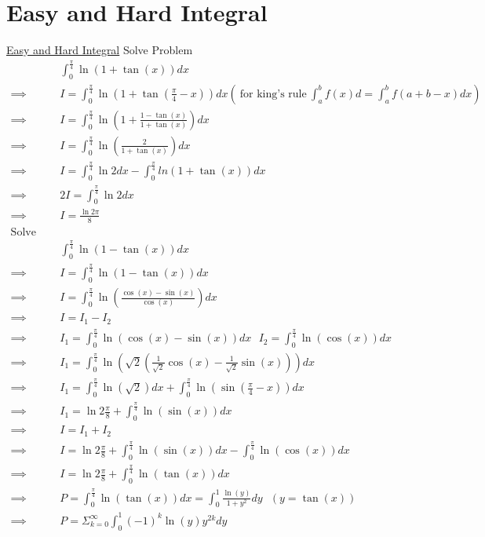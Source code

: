 \documentclass {article}
\begin{document}
\section{Easy and Hard Integral}
\href{https://www.youtube.com/watch?v=o4TR62QvQJU}{Easy and Hard Integral}
Solve Problem \\
\[
\begin{matrix}
     & \int_0^{\frac{\pi}{4}} \ln\left(1 + \tan\left(x\right)\right){d}x  \\
\implies &  I = \int_0^{\frac{\pi}{4}} \ln\left(1 + \tan\left(\frac{\pi}{4} - x\right)\right){d}x
  \left( \ \text{for king's rule}\ \int_a^b f(x){d} = \int_a^b f(a+b-x) {d}x \right) \\
\implies & I = \int_0^{\frac{\pi}{4}} \ln\left( 1 + \frac{1 - \tan(x)}{1+ \tan(x)} \right) {d}x \\
\implies & I = \int_0^{\frac{\pi}{4}} \ln\left(\frac {2}{1 + \tan(x)}\right) {d}x \\
\implies & I = \int_0^{\frac{\pi}{4}} \ln2 {d}x - \int_0^{\frac{\pi}{4}} ln\left(1 + \tan(x)\right) {d}x \\
\implies & 2I = \int_0^{\frac{\pi}{4}} \ln2 {d}x \\
\implies & I = \frac{\ln2\pi}{8} \\

\text{Solve Problem} \\
 & \int_0^{\frac{\pi}{4}} \ln\left(1 - \tan\left(x\right)\right){d}x  \\
\implies & I = \int_0^{\frac{\pi}{4}} \ln\left(1 - \tan\left(x\right)\right){d}x \\
\implies & I = \int_0^{\frac{\pi}{4}} \ln\left(\frac {\cos(x) - \sin(x)}{\cos(x)}\right){d}x \\
\implies & I = I_1 - I_2 \\
\implies & I_1 = \int_0^{\frac{\pi}{4}} \ln\left(\cos(x) - \sin(x)\right){d}x \text{ } I_2 = \int_0^{\frac{\pi}{4}} \ln\left(\cos(x)\right){d}x \\
\implies & I_1 = \int_0^{\frac{\pi}{4}} \ln\left(\sqrt{2}\left(\frac{1}{\sqrt{2} }\cos(x) - \frac{1}{\sqrt{2}}\sin(x)\right)\right){d}x \\
\implies & I_1 = \int_0^{\frac{\pi}{4}} \ln(\sqrt{2}){d}x + \int_0^{\frac{\pi}{4}}\ln\left(\sin(\frac{\pi}{4} - x)\right){d}x\\
\implies & I_1 = \ln2 \frac{\pi}{8} + \int_0^{\frac{\pi}{4}}\ln\left(\sin(x)\right){d}x \\
\implies & I = I_1 + I_2 \\
\implies & I = \ln2 \frac{\pi}{8} + \int_0^{\frac{\pi}{4}}\ln\left(\sin(x)\right){d}x - \int_0^{\frac{\pi}{4}} \ln\left(\cos(x)\right){d}x \\
\implies & I = \ln2 \frac{\pi}{8} + \int_0^{\frac{\pi}{4}} \ln(\tan(x)){d}x \\
\implies & P = \int_0^{\frac{\pi}{4}}\ln(\tan(x)){d}x = \int_0^{1} \frac{\ln(y)} {1 + y^2}{d}y \text{ } \left(y = \tan(x)\right) \\
\implies & P = \displaystyle\Sigma_{k=0}^{\infty} \int_0^1(-1)^k \ln(y)y^{2k} {d}y \\
\end{matrix}
\]
\end{document}
